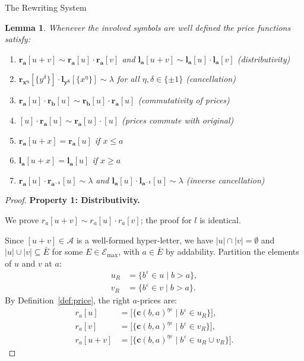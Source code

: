 \documentclass{article}
\newtheorem{lemma}[theorem]{Lemma}
\theoremstyle{definition}
\theoremstyle{remark}
\theoremstyle{theorem}
\theoremstyle{definition}
\begin{document}
\begin{section}{The Rewriting System}
\begin{lemma}\label{lem:price_properties}
Whenever the involved symbols are well defined the price functions satisfy:
\begin{enumerate}
    \item $\mathbf{r_a}[u+v] \sim \mathbf{r_a}[u] \cdot \mathbf{r_a}[v]$ and $\mathbf{l_a}[u+v] \sim \mathbf{l_a}[u] \cdot \mathbf{l_a}[v]$ (distributivity)
    \item $\mathbf{r_{x^\eta}}[\{y^\delta\}] \cdot \mathbf{l_{y^\delta}}[\{x^\eta\}] \sim \lambda$ for all $\eta,\delta\in\{\pm 1\}$ (cancellation)
    \item $\mathbf{r_a}[u] \cdot \mathbf{r_b}[u] \sim \mathbf{r_b}[u] \cdot \mathbf{r_a}[u]$ (commutativity of prices)
    \item $[u] \cdot \mathbf{r_a}[u] \sim \mathbf{r_a}[u] \cdot [u]$ (prices commute with original)
    \item $\mathbf{r_a}[u+x] = \mathbf{r_a}[u]$ if $x\leq a$
    \item $\mathbf{l_a}[u+x] = \mathbf{l_a}[u]$ if $x\geq a$
    \item $\mathbf{r_a}[u] \cdot \mathbf{r_{a^{-1}}}[u] \sim \lambda$ and $\mathbf{l_a}[u] \cdot \mathbf{l_{a^{-1}}}[u] \sim \lambda$ (inverse cancellation)
\end{enumerate}
\end{lemma}

\begin{proof}
\textbf{Property 1: Distributivity.}

We prove $r_a[u + v] \sim r_a[u] \cdot r_a[v]$; the proof for $l$ is identical.

Since $[u + v] \in \mathcal{A}$ is a well-formed hyper-letter, we have
$|u| \cap |v| = \emptyset$ and $|u| \cup |v| \subseteq \bar{E}$ for some
$E \in \mathcal{E}_{\max}$, with $a \in \bar{E}$ by addability.
Partition the elements of $u$ and $v$ at $a$:
\begin{align*}
  u_R &= \{ b^{\varepsilon} \in u \mid b > a \}, \\
  v_R &= \{ b^{\varepsilon} \in v \mid b > a \}.
\end{align*}
By Definition~\ref{def:price}, the right $a$-prices are:
\begin{align*}
  r_a[u]   &= \bigl[\{ \mathbf{c}(b,a)^{\eta\varepsilon} \mid b^{\varepsilon} \in u_R \}\bigr], \\
  r_a[v]   &= \bigl[\{ \mathbf{c}(b,a)^{\eta\varepsilon} \mid b^{\varepsilon} \in v_R \}\bigr], \\
  r_a[u+v] &= \bigl[\{ \mathbf{c}(b,a)^{\eta\varepsilon} \mid b^{\varepsilon} \in u_R \cup v_R \}\bigr].
\end{align*}


\end{proof}
\end{section}
\end{document}
